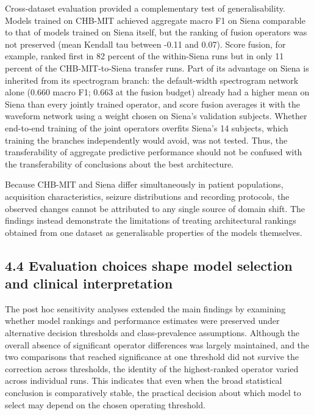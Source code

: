 \documentclass[11pt,a4paper]{article}
\begin{document}
Cross-dataset evaluation provided a complementary test of generalisability. Models
trained on CHB-MIT achieved aggregate macro F1 on Siena comparable to that of models
trained on Siena itself, but the ranking of fusion operators was not preserved (mean
Kendall tau between -0.11 and 0.07). Score fusion, for example, ranked first in 82
percent of the within-Siena runs but in only 11 percent of the CHB-MIT-to-Siena transfer
runs. Part of its advantage on Siena is inherited from its spectrogram branch: the
default-width spectrogram network alone (0.660 macro F1; 0.663 at the fusion budget) already had a higher mean on Siena than every
jointly trained operator, and score fusion averages it with the waveform network using a
weight chosen on Siena's validation subjects. Whether end-to-end training of the joint
operators overfits Siena's 14 subjects, which training the branches independently would
avoid, was not tested. Thus, the transferability of aggregate predictive performance
should not be confused with the transferability of conclusions about the best
architecture.

Because CHB-MIT and Siena differ simultaneously in patient populations, acquisition
characteristics, seizure distributions and recording protocols, the observed changes
cannot be attributed to any single source of domain shift. The findings instead
demonstrate the limitations of treating architectural rankings obtained from one dataset
as generalisable properties of the models themselves.

\subsection{4.4 Evaluation choices shape model selection and clinical interpretation}\label{evaluation-choices-shape-model-selection-and-clinical-interpretation}

The post hoc sensitivity analyses extended the main findings by examining whether model
rankings and performance estimates were preserved under alternative decision thresholds
and class-prevalence assumptions. Although the overall absence of significant operator
differences was largely maintained, and the two comparisons that reached significance at
one threshold did not survive the correction across thresholds, the identity of the
highest-ranked operator varied across individual runs. This indicates that even when the
broad statistical conclusion is comparatively stable, the practical decision about which
model to select may depend on the chosen operating threshold.
\end{document}
